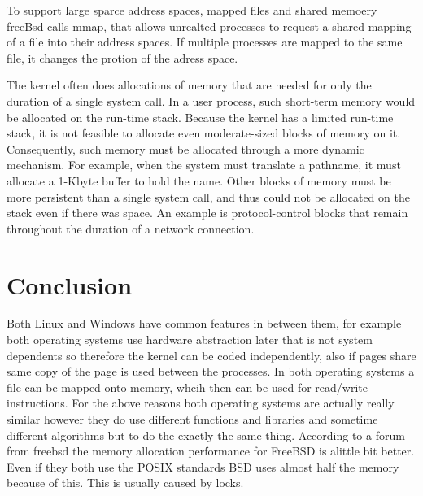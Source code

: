 \documentclass[letterpaper,10pt,draftclsnofoot,onecolumn]{IEEEtran}
\begin{document}
To support large sparce address spaces, mapped files and shared memoery freeBsd calls mmap, that allows unrealted processes to request a shared mapping of a file into their address spaces. If multiple processes are mapped to the same file, it changes the protion of the adress space.

The kernel often does allocations of memory that are needed for only the duration of a single system call. In a user process, such short-term memory would be allocated on the run-time stack. Because the kernel has a limited run-time stack, it is not feasible to allocate even moderate-sized blocks of memory on it. Consequently, such memory must be allocated through a more dynamic mechanism. For example, when the system must translate a pathname, it must allocate a 1-Kbyte buffer to hold the name. Other blocks of memory must be more persistent than a single system call, and thus could not be allocated on the stack even if there was space. An example is protocol-control blocks that remain throughout the duration of a network connection.\cite{[2]}
\section*{Conclusion}

Both Linux and Windows have common features in between them, for example both operating systems use hardware abstraction later that is not system dependents so therefore the kernel can be coded independently, also if pages share same copy of the page is used between the processes. In both operating systems a file can be mapped onto memory, whcih then can be used for read/write instructions. For the above reasons both operating systems are actually really similar however they do use different functions and libraries and sometime different algorithms but to do the exactly the same thing. According to a forum from freebsd the memory allocation performance for FreeBSD is alittle bit better. Even if they both use the POSIX standards BSD uses almost half the memory because of this. This is usually caused by locks.



\end{document}
